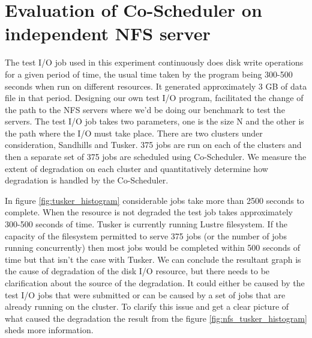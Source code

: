 \documentclass[ms,electronic,double]{nuthesis}
\begin{document}
\section{Evaluation of Co-Scheduler on independent NFS server}

The test I/O job used in this experiment continuously does disk write operations for a given period of time, the 
usual time taken by the program being 300-500 seconds when run on different resources. It generated approximately 3 GB of data file
in that period. Designing our own test I/O program,  facilitated the change of the path
to the NFS servers where we'd be doing our benchmark to test the servers. The test I/O job takes two 
parameters, 
one is the size N and the other is the path where the I/O must take place. There are two 
clusters under consideration, Sandhills and Tusker. 375 jobs are run on each of 
the clusters and then a separate set of 375 jobs are scheduled using 
Co-Scheduler. We measure the extent of degradation on each cluster and quantitatively 
determine how degradation is handled by the Co-Scheduler.

In figure \ref{fig:tusker_histogram}  considerable jobs take more than 2500 seconds to complete. 
When the resource is not degraded the test job takes approximately 300-500 seconds of time. Tusker is 
currently running Lustre filesystem. If the capacity of the filesystem permitted 
to serve 375 jobs (or the number of jobs running concurrently) then most jobs 
would be completed within 500 seconds of time but that isn't the case with Tusker. We can conclude the resultant graph is the cause of degradation 
of the disk I/O resource, but there needs to be clarification about the source of the degradation. 
It could either be caused by the test I/O jobs that were submitted or can be caused 
by a set of jobs that are already running on the cluster. To clarify this issue 
and get a clear picture of what caused the degradation the result from the 
figure \ref{fig:nfs_tusker_histogram} sheds more information.
\end{document}
